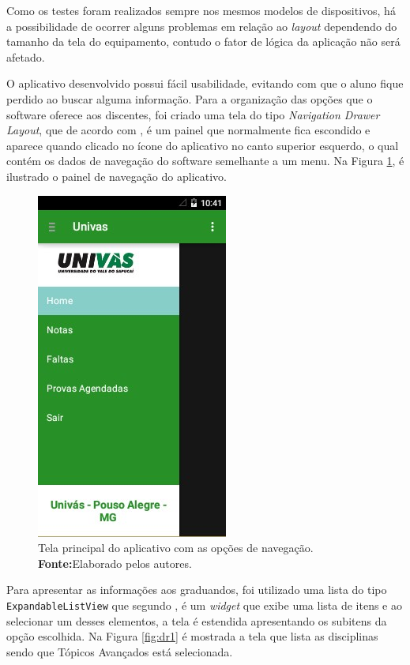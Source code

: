	\par Como os testes foram realizados sempre nos mesmos modelos de dispositivos,
há a possibilidade de ocorrer alguns problemas em relação ao \textit{layout}
dependendo do tamanho da tela do equipamento, contudo o fator de lógica da
aplicação não será afetado.

	\par O aplicativo desenvolvido possui fácil usabilidade, evitando com que o
aluno fique perdido ao buscar alguma informação. Para a organização das opções
que o software oferece aos discentes, foi criado uma tela do tipo
\textit{Navigation Drawer Layout}, que de acordo com ,
é um painel que normalmente fica escondido e aparece quando clicado no ícone do
aplicativo no canto superior esquerdo, o qual contém os dados de navegação do
software semelhante a um menu. Na Figura \ref{fig:dr}, é ilustrado o painel de
navegação do aplicativo.
	 
\begin{figure}[h!]
	\centerline{\includegraphics[scale=0.8]{./imagens/3_discussao_resultados/dr.jpg}}
	\caption[Tela principal do aplicativo com as opções de navegação]{Tela
	principal do aplicativo com as opções de navegação.
	\textbf{Fonte:}Elaborado pelos autores.}
	\label{fig:dr}
\end{figure}

	\par Para apresentar as informações aos graduandos, foi utilizado uma lista do
tipo \texttt{ExpandableListView} que segundo , é um
\textit{widget} que exibe uma lista de itens e ao selecionar um desses
elementos, a tela é estendida apresentando os subitens da opção escolhida. Na
Figura \ref{fig:dr1} é mostrada a tela que lista as disciplinas sendo que
Tópicos Avançados está selecionada.


